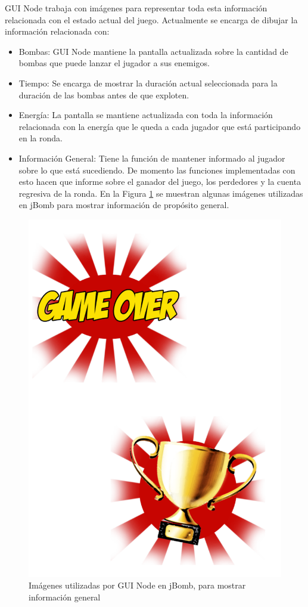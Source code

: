 \documentclass[a4paper,12pt,openany,oneside]{book}
\begin{document}
GUI Node trabaja con imágenes para representar toda esta información relacionada con el estado actual del juego. Actualmente se encarga de dibujar la información relacionada con:
\begin{itemize}
\item Bombas: GUI Node mantiene la pantalla actualizada sobre la cantidad de bombas que puede lanzar el jugador a sus enemigos.
\item Tiempo: Se encarga de mostrar la duración actual seleccionada para la duración de las bombas antes de que exploten.
\item Energía: La pantalla se mantiene actualizada con toda la información relacionada con la energía que le queda a cada jugador que está participando en la ronda.
\item Información General: Tiene la función de mantener informado al jugador sobre lo que está sucediendo. De momento las funciones implementadas con esto hacen que informe sobre el ganador del juego, los perdedores y la cuenta regresiva de la ronda. En la Figura \ref{infogeneral} se muestran algunas imágenes utilizadas en jBomb para mostrar información de propósito general.
\end{itemize}
\begin{figure}[!hbp]
\begin{center}
\includegraphics[scale=0.7]{images.pdf}
\caption[Utilización de imágenes en jBomb]{Imágenes utilizadas por GUI Node en jBomb, para mostrar información general}\label{infogeneral}
\end{center}
\end{figure}
\end{document}
